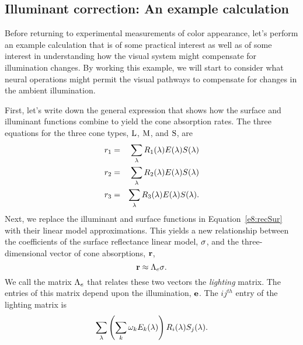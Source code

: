 \subsection*{Illuminant correction:  An example calculation}
Before returning to experimental measurements of color appearance,
let's perform an example calculation that is of some practical
interest as well as of some interest in understanding how the visual
system might compensate for illumination changes.  By working this
example, we will start to consider what neural operations might permit
the visual pathways to compensate for changes in the ambient
illumination.

First, let's write down the general expression that shows how the
surface and illuminant functions combine to yield the cone absorption
rates.  The three equations for the three cone types, $\mbox{L}$,
$\mbox{M}$, and $\mbox{S}$, are
\begin{eqnarray}
\label{e8:recSur}
\mbox{$r_{1}$} & = & 
   \sum_{\lambda} \mbox{$R_{1}$}(\lambda) E(\lambda) S(\lambda) \nonumber \\
\mbox{$r_{2}$} & = & 
   \sum_{\lambda} \mbox{$R_{2}$}(\lambda) E(\lambda) S(\lambda) \nonumber \\
r_3 & = & 
   \sum_{\lambda} \mbox{$R_{3}$}(\lambda) E(\lambda) S(\lambda) .
\end{eqnarray}
Next, we replace the illuminant and surface functions in
Equation~\ref{e8:recSur} with their linear model approximations. This
yields a new relationship between the coefficients of the surface
reflectance linear model, $\mbox{${\bf \sigma}$}$, and the three-dimensional vector
of cone absorptions, $\mbox{$\bf r$}$,
\begin{equation}
\label{e8:est1}
\mbox{$\bf r$} \approx \mbox{$\Lambda_{e}$} \mbox{${\bf \sigma}$} .
\end{equation}
We call the matrix $\mbox{$\Lambda_{e}$}$ that relates these two vectors the
{\em lighting} matrix.  The entries of this matrix depend upon the
illumination, $\mbox{$\bf e$}$.  The $ij^{th}$ entry of the lighting matrix
is
\begin{equation}
\label{e8:lmatrix}
\sum_{\lambda} 
 \left (
  \sum_k \mbox{$\omega_{k}$} \mbox{$E_{k}(\lambda)$} \right )
       \mbox{$R_{i}$}(\lambda) 
       \mbox{$S_{j}(\lambda)$} .
\end{equation}

